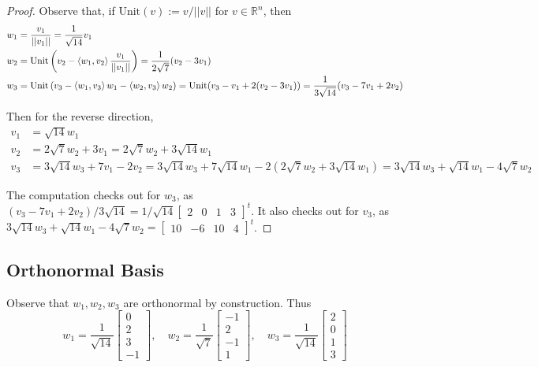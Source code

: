 \documentclass{article}
\theoremstyle{named}
\begin{document}
\begin{proof}
    Observe that, if $\text{Unit}(v) := v / ||v||$ for $v \in \mathbb{R}^n$, then 
    \begin{align*}
        w_1 &= \frac{v_1}{||v_1||} = \frac{1}{\sqrt{14}} v_1 \\
        w_2 &= \text{Unit}\left(v_2 - \braket{w_1, v_2} \frac{v_1}{||v_1||}\right) = \frac{1}{2\sqrt{7}} ( v_2 - 3v_1) \\
        w_3 &= \text{Unit}\left(v_3 - \braket{w_1, v_3}w_1 - \braket{w_2, v_3}w_2\right) = \text{Unit} (v_3 - v_1 + 2(v_2 - 3v_1)) = \frac{1}{3\sqrt{14}} (v_3 - 7v_1 + 2v_2) 
    \end{align*}

    Then for the reverse direction, 
    \begin{align*}
        v_1 &= \sqrt{14} w_1 \\
        v_2 &= 2\sqrt{7} w_2 + 3v_1 = 2\sqrt{7} w_2 + 3\sqrt{14} w_1 \\
        v_3 &= 3\sqrt{14} w_3 + 7v_1 - 2v_2 = 3\sqrt{14} w_3 + 7\sqrt{14} w_1 - 2(2\sqrt{7} w_2 + 3\sqrt{14} w_1) = 3\sqrt{14} w_3 + \sqrt{14} w_1 - 4\sqrt{7} w_2
    \end{align*}

    The computation checks out for $w_3$, as $(v_3 - 7v_1 + 2v_2) / 3\sqrt{14} = 1/\sqrt{14} \begin{bmatrix} 2 & 0 & 1 & 3 \end{bmatrix}^t$. It also checks out for $v_3$, as $3\sqrt{14} w_3 + \sqrt{14} w_1 - 4\sqrt{7} w_2 = \begin{bmatrix} 10 & -6 & 10 & 4 \end{bmatrix}^t$. 
\end{proof}

\subsection{Orthonormal Basis}

Observe that $w_1, w_2, w_3$ are orthonormal by construction. Thus 
\[
    w_1 = \frac{1}{\sqrt{14}} \begin{bmatrix} 0 \\ 2 \\ 3 \\ -1 \end{bmatrix}, \quad w_2 = \frac{1}{\sqrt{7}} \begin{bmatrix} -1 \\ 2 \\ -1 \\ 1 \end{bmatrix}, \quad w_3 = \frac{1}{\sqrt{14}} \begin{bmatrix} 2 \\ 0 \\ 1 \\ 3 \end{bmatrix}
\]
\end{document}
